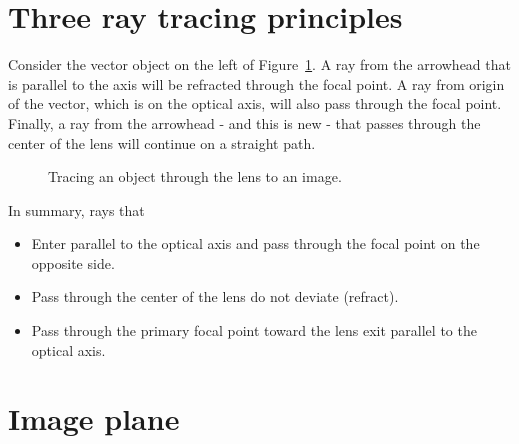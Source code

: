 \documentclass[
  letterpaper,
]{book}
\providecommand{\tightlist}{%
  \setlength{\itemsep}{0pt}\setlength{\parskip}{0pt}}\usepackage{longtable,booktabs,array}
\begin{document}
\section{Three ray tracing principles}\label{sec-optics-3principles}

Consider the vector object on the left of
Figure~\ref{fig-lensmaker-center}. A ray from the arrowhead that is
parallel to the axis will be refracted through the focal point. A ray
from origin of the vector, which is on the optical axis, will also pass
through the focal point. Finally, a ray from the arrowhead - and this is
new - that passes through the center of the lens will continue on a
straight path.

\begin{figure}


\caption{\label{fig-lensmaker-center}Tracing an object through the lens
to an image.}

\end{figure}%

In summary, rays that

\begin{itemize}
\tightlist
\item
  Enter parallel to the optical axis and pass through the focal point on
  the opposite side.
\item
  Pass through the center of the lens do not deviate (refract).
\item
  Pass through the primary focal point toward the lens exit parallel to
  the optical axis.
\end{itemize}

\section{Image plane}\label{sec-optics-imageplane}
\end{document}
